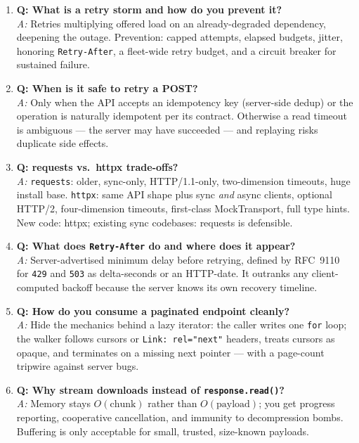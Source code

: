\begin{enumerate}
  \item \textbf{Q: What is a retry storm and how do you prevent it?}\\
        \textit{A:} Retries multiplying offered load on an already-degraded
        dependency, deepening the outage. Prevention: capped attempts,
        elapsed budgets, jitter, honoring \texttt{Retry-After}, a fleet-wide
        retry budget, and a circuit breaker for sustained failure.

  \item \textbf{Q: When is it safe to retry a POST?}\\
        \textit{A:} Only when the API accepts an idempotency key
        (server-side dedup) or the operation is naturally idempotent per its
        contract. Otherwise a read timeout is ambiguous --- the server may
        have succeeded --- and replaying risks duplicate side effects.

  \item \textbf{Q: requests vs.\ httpx trade-offs?}\\
        \textit{A:} \texttt{requests}: older, sync-only, HTTP/1.1-only,
        two-dimension timeouts, huge install base. \texttt{httpx}: same API
        shape plus sync \emph{and} async clients, optional HTTP/2,
        four-dimension timeouts, first-class MockTransport, full type hints.
        New code: httpx; existing sync codebases: requests is defensible.

  \item \textbf{Q: What does \texttt{Retry-After} do and where does it
        appear?}\\
        \textit{A:} Server-advertised minimum delay before retrying, defined
        by RFC~9110 \cite{rfc9110} for \texttt{429} and \texttt{503} as
        delta-seconds or an HTTP-date. It outranks any client-computed
        backoff because the server knows its own recovery timeline.

  \item \textbf{Q: How do you consume a paginated endpoint cleanly?}\\
        \textit{A:} Hide the mechanics behind a lazy iterator: the caller
        writes one \texttt{for} loop; the walker follows cursors or
        \texttt{Link: rel="next"} headers, treats cursors as opaque, and
        terminates on a missing next pointer --- with a page-count tripwire
        against server bugs.

  \item \textbf{Q: Why stream downloads instead of \texttt{response.read()}?}\\
        \textit{A:} Memory stays $O(\text{chunk})$ rather than
        $O(\text{payload})$; you get progress reporting, cooperative
        cancellation, and immunity to decompression bombs. Buffering is only
        acceptable for small, trusted, size-known payloads.
\end{enumerate}

